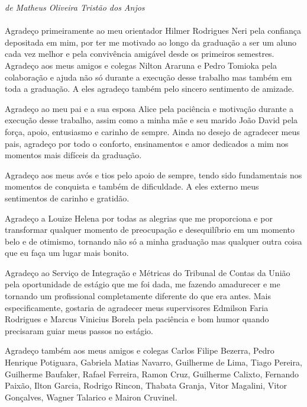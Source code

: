 \begin{agradecimentos}

\emph{de Matheus Oliveira Tristão dos Anjos} \\ \\

Agradeço primeiramente ao meu orientador Hilmer Rodrigues Neri pela confiança depositada em mim, por ter me motivado ao longo da graduação a ser um aluno cada vez melhor e pela convivência amigável desde os primeiros semestres. Agradeço aos meus amigos e colegas Nilton Araruna e Pedro Tomioka pela colaboração e ajuda não só durante a execução desse trabalho mas também em toda a graduação. A eles agradeço também pelo sincero sentimento de amizade.

Agradeço ao meu pai e a sua esposa Alice pela paciência e motivação durante a execução desse trabalho, assim como a minha mãe e seu marido João David pela força, apoio, entusiasmo e carinho de sempre. Ainda no desejo de agradecer meus pais, agradeço por todo o conforto, ensinamentos e amor dedicados a mim nos momentos mais difíceis da graduação.

Agradeço aos meus avós e tios pelo apoio de sempre, tendo sido fundamentais nos momentos de conquista e também de dificuldade. A eles externo meus sentimentos de carinho e gratidão.

Agradeço a Louize Helena por todas as alegrias que me proporciona e por transformar qualquer momento de preocupação e desequilíbrio em um momento belo e de otimismo, tornando não só a minha graduação mas qualquer outra coisa que eu faça um lugar mais bonito. 

Agradeço ao Serviço de Integração e Métricas do Tribunal de Contas da União pela oportunidade de estágio que me foi dada, me fazendo amadurecer e me tornando um profissional completamente diferente do que era antes. Mais especificamente, gostaria de agradecer meus supervisores Edmilson Faria Rodrigues e Marcus Vinicius Borela pela paciência e bom humor quando precisaram guiar meus passos no estágio.

Agradeço também aos meus amigos e colegas Carlos Filipe Bezerra, Pedro Henrique Potiguara, Gabriela Matias Navarro, Guilherme de Lima, Tiago Pereira, Guilherme Baufaker, Rafael Ferreira, Ramon Cruz, Guilherme Calixto, Fernando Paixão, Ilton Garcia, Rodrigo Rincon, Thabata Granja, Vitor Magalini, Vitor Gonçalves, Wagner Talarico e Mairon Cruvinel. 


\end{agradecimentos}
